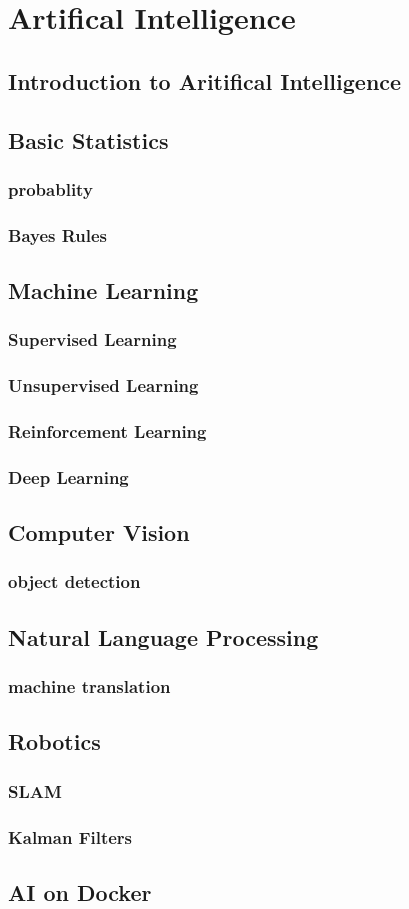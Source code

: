 \chapter{Artifical Intelligence}

\section{Introduction to Aritifical Intelligence}

\section{Basic Statistics}
\subsection{probablity}
\subsection{Bayes Rules}

\section{Machine Learning}
\subsection{Supervised Learning}
\subsection{Unsupervised Learning}
\subsection{Reinforcement Learning}
\subsection{Deep Learning}

\section{Computer Vision}
\subsection{object detection}

\section{Natural Language Processing}
\subsection{machine translation}

\section{Robotics}
\subsection{SLAM}
\subsection{Kalman Filters}

\section{AI on Docker}

